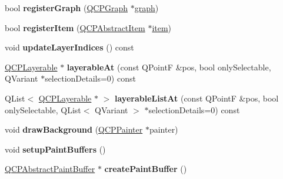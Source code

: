 \begin{DoxyCompactItemize}
\item 
bool {\bfseries register\+Graph} (\hyperlink{classQCPGraph}{Q\+C\+P\+Graph} $\ast$\hyperlink{classQCustomPlot_a6d3ed93c2bf46ab7fa670d66be4cddaf}{graph})\hypertarget{classQCustomPlot_acfc01230bddaea4f1782e4aa7d130af6}{}\label{classQCustomPlot_acfc01230bddaea4f1782e4aa7d130af6}

\item 
bool {\bfseries register\+Item} (\hyperlink{classQCPAbstractItem}{Q\+C\+P\+Abstract\+Item} $\ast$\hyperlink{classQCustomPlot_a3e842b5a65b1d17fbb96cfb1fa1314d1}{item})\hypertarget{classQCustomPlot_afbd4010b2e3f364c8d512691b2a1640a}{}\label{classQCustomPlot_afbd4010b2e3f364c8d512691b2a1640a}

\item 
void {\bfseries update\+Layer\+Indices} () const \hypertarget{classQCustomPlot_a3117754df3a5638787a6223c7147970f}{}\label{classQCustomPlot_a3117754df3a5638787a6223c7147970f}

\item 
\hyperlink{classQCPLayerable}{Q\+C\+P\+Layerable} $\ast$ {\bfseries layerable\+At} (const Q\+PointF \&pos, bool only\+Selectable, Q\+Variant $\ast$selection\+Details=0) const \hypertarget{classQCustomPlot_a3fffd1d8364f657482ae985e0b5aa028}{}\label{classQCustomPlot_a3fffd1d8364f657482ae985e0b5aa028}

\item 
Q\+List$<$ \hyperlink{classQCPLayerable}{Q\+C\+P\+Layerable} $\ast$ $>$ {\bfseries layerable\+List\+At} (const Q\+PointF \&pos, bool only\+Selectable, Q\+List$<$ Q\+Variant $>$ $\ast$selection\+Details=0) const \hypertarget{classQCustomPlot_af80753be504e55fdcc366845c021d7cb}{}\label{classQCustomPlot_af80753be504e55fdcc366845c021d7cb}

\item 
void {\bfseries draw\+Background} (\hyperlink{classQCPPainter}{Q\+C\+P\+Painter} $\ast$painter)\hypertarget{classQCustomPlot_a05dd52438cee4353b18c1e53a439008d}{}\label{classQCustomPlot_a05dd52438cee4353b18c1e53a439008d}

\item 
void {\bfseries setup\+Paint\+Buffers} ()\hypertarget{classQCustomPlot_a2685341f7242c3882f4cc5e379308d71}{}\label{classQCustomPlot_a2685341f7242c3882f4cc5e379308d71}

\item 
\hyperlink{classQCPAbstractPaintBuffer}{Q\+C\+P\+Abstract\+Paint\+Buffer} $\ast$ {\bfseries create\+Paint\+Buffer} ()\hypertarget{classQCustomPlot_a943b57596a1adf7f0e75c3b50e407ae6}{}\label{classQCustomPlot_a943b57596a1adf7f0e75c3b50e407ae6}


\end{DoxyCompactItemize}
